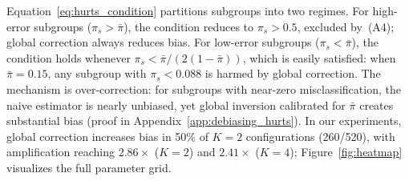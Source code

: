 Equation~\eqref{eq:hurts_condition} partitions subgroups into two regimes.
For high-error subgroups ($\pi_s > \bar{\pi}$), the condition reduces to $\pi_s > 0.5$, excluded by~(A4); global correction always reduces bias.
For low-error subgroups ($\pi_s < \bar{\pi}$), the condition holds whenever $\pi_s < \bar{\pi} / (2(1{-}\bar{\pi}))$, which is easily satisfied: when $\bar{\pi} = 0.15$, any subgroup with $\pi_s < 0.088$ is harmed by global correction.
The mechanism is over-correction: for subgroups with near-zero misclassification, the naive estimator is nearly unbiased, yet global inversion calibrated for $\bar{\pi}$ creates substantial bias (proof in Appendix~\ref{app:debiasing_hurts}).
In our experiments, global correction increases bias in 50\% of $K{=}2$ configurations (260/520), with amplification reaching $2.86\times$ ($K{=}2$) and $2.41\times$ ($K{=}4$); Figure~\ref{fig:heatmap} visualizes the full parameter grid.